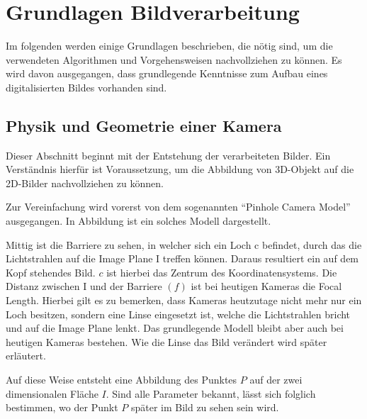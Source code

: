 \section{Grundlagen Bildverarbeitung}
\label{sec:basics}
Im folgenden werden einige Grundlagen beschrieben, die nötig sind, um die verwendeten Algorithmen und Vorgehensweisen nachvollziehen zu können. Es wird davon ausgegangen, dass grundlegende Kenntnisse zum Aufbau eines digitalisierten Bildes vorhanden sind. 
\subsection{Physik und Geometrie einer Kamera}
\label{sec:camerageo}
Dieser Abschnitt beginnt mit der Entstehung der verarbeiteten Bilder. Ein Verständnis hierfür ist Voraussetzung, um die Abbildung von 3D-Objekt auf die 2D-Bilder nachvollziehen zu können.

Zur Vereinfachung wird vorerst von dem sogenannten "`Pinhole Camera Model"' ausgegangen. In Abbildung  ist ein solches Modell dargestellt. 

Mittig ist die Barriere zu sehen, in welcher sich ein Loch c befindet, durch das die Lichtstrahlen auf die Image Plane I treffen können. Daraus resultiert ein auf dem Kopf stehendes Bild. $c$ ist hierbei das Zentrum des Koordinatensystems.
Die Distanz zwischen I und der Barriere $(f)$ ist bei heutigen Kameras die Focal Length. Hierbei gilt es zu bemerken, dass Kameras heutzutage nicht mehr nur ein Loch besitzen, sondern eine Linse eingesetzt ist, welche die Lichtstrahlen bricht und auf die Image Plane lenkt. Das grundlegende Modell bleibt aber auch bei heutigen Kameras bestehen. Wie die Linse das Bild verändert wird später erläutert. 

Auf diese Weise entsteht eine Abbildung des Punktes $P$ auf der zwei dimensionalen Fläche $I$. Sind alle Parameter bekannt, lässt sich folglich bestimmen, wo der Punkt $P$ später im Bild zu sehen sein wird. 

